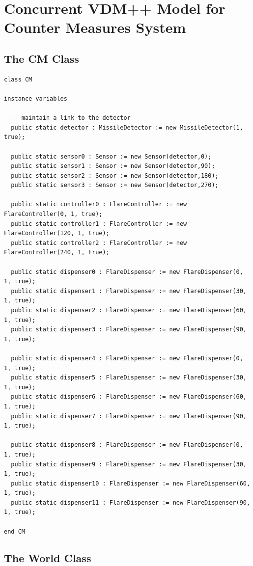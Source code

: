 \documentclass{overturerepchap}
\begin{document}
\section{Concurrent VDM++ Model for Counter Measures System}\label{app:concurCM}
\subsection{The CM Class}

\begin{lstlisting}
class CM

instance variables

  -- maintain a link to the detector
  public static detector : MissileDetector := new MissileDetector(1, true);

  public static sensor0 : Sensor := new Sensor(detector,0);
  public static sensor1 : Sensor := new Sensor(detector,90);
  public static sensor2 : Sensor := new Sensor(detector,180);
  public static sensor3 : Sensor := new Sensor(detector,270);

  public static controller0 : FlareController := new FlareController(0, 1, true);
  public static controller1 : FlareController := new FlareController(120, 1, true);
  public static controller2 : FlareController := new FlareController(240, 1, true);

  public static dispenser0 : FlareDispenser := new FlareDispenser(0, 1, true);
  public static dispenser1 : FlareDispenser := new FlareDispenser(30, 1, true);
  public static dispenser2 : FlareDispenser := new FlareDispenser(60, 1, true);
  public static dispenser3 : FlareDispenser := new FlareDispenser(90, 1, true);

  public static dispenser4 : FlareDispenser := new FlareDispenser(0, 1, true);
  public static dispenser5 : FlareDispenser := new FlareDispenser(30, 1, true);
  public static dispenser6 : FlareDispenser := new FlareDispenser(60, 1, true);
  public static dispenser7 : FlareDispenser := new FlareDispenser(90, 1, true);

  public static dispenser8 : FlareDispenser := new FlareDispenser(0, 1, true);
  public static dispenser9 : FlareDispenser := new FlareDispenser(30, 1, true);
  public static dispenser10 : FlareDispenser := new FlareDispenser(60, 1, true);
  public static dispenser11 : FlareDispenser := new FlareDispenser(90, 1, true);

end CM
\end{lstlisting}

\subsection{The World Class}
\end{document}
